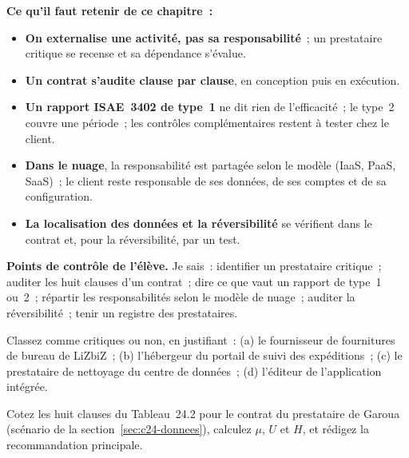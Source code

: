 \separateur

\begin{boxresume}
\textbf{Ce qu'il faut retenir de ce chapitre~:}
\begin{itemize}
    \item \textbf{On externalise une activité, pas sa responsabilité}~; un
          prestataire critique se recense et sa dépendance s'évalue.
    \item \textbf{Un contrat s'audite clause par clause}, en conception
          puis en exécution.
    \item \textbf{Un rapport ISAE~3402 de type~1} ne dit rien de
          l'efficacité~; le type~2 couvre une période~; les contrôles
          complémentaires restent à tester chez le client.
    \item \textbf{Dans le nuage}, la responsabilité est partagée selon le
          modèle (IaaS, PaaS, SaaS)~; le client reste responsable de ses
          données, de ses comptes et de sa configuration.
    \item \textbf{La localisation des données et la réversibilité} se
          vérifient dans le contrat et, pour la réversibilité, par un test.
\end{itemize}
\end{boxresume}

\begin{boxinfo}
\textbf{Points de contrôle de l'élève.} Je sais~: identifier un prestataire
critique~; auditer les huit clauses d'un contrat~; dire ce que vaut un
rapport de type~1 ou~2~; répartir les responsabilités selon le modèle de
nuage~; auditer la réversibilité~; tenir un registre des prestataires.
\end{boxinfo}

\bigskip

\begin{boxexo}[title={\ding{45}\quad Exercice~24.1. Critique ou non~? \niveaubase}]
Classez comme critiques ou non, en justifiant~: (a) le fournisseur de
fournitures de bureau de LiZbiZ~; (b) l'hébergeur du portail de suivi des
expéditions~; (c) le prestataire de nettoyage du centre de données~; (d)
l'éditeur de l'application intégrée.
\end{boxexo}

\begin{boxexo}[title={\ding{45}\quad Exercice~24.2. Coter un contrat \niveaumoyen}]
Cotez les huit clauses du Tableau~24.2 pour le contrat du prestataire de
Garoua (scénario de la section~\ref{sec:c24-donnees}), calculez $\mu$,
$U$ et $H$, et rédigez la recommandation principale.
\end{boxexo}

